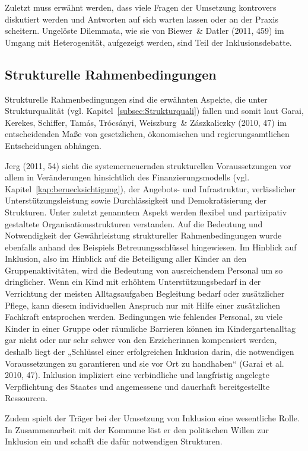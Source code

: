 Zuletzt muss erwähnt werden, dass viele Fragen der Umsetzung kontrovers diskutiert werden und Antworten auf sich warten lassen oder an der Praxis scheitern. Ungelöste Dilemmata, wie sie von Biewer~\& Datler (2011, 459) im Umgang mit Heterogenität, aufgezeigt werden, sind Teil der Inklusionsdebatte. 

\subsection{Strukturelle Rahmenbedingungen}\label{Strukturelle Rahmenbedingungen}
Strukturelle Rahmenbedingungen sind die erwähnten Aspekte, die unter Strukturqualität (vgl. Kapitel~\ref{subsec:Strukturquali}) fallen und somit laut Garai, Kerekes, Schiffer, Tamás, Trócsányi, Weiszburg~\& Zászkaliczky (2010, 47) im entscheidenden Maße von gesetzlichen, ökonomischen und regierungsamtlichen Entscheidungen abhängen.

Jerg (2011, 54) sieht die systemerneuernden strukturellen Voraussetzungen vor allem in Veränderungen hinsichtlich des Finanzierungsmodells (vgl. Kapitel~\ref{kap:beruecksichtigung}), der Angebots- und Infrastruktur, verlässlicher Unterstützungsleistung sowie Durchlässigkeit und Demokratisierung der Strukturen. Unter zuletzt genanntem Aspekt werden flexibel und partizipativ gestaltete Organisationsstrukturen verstanden. 
Auf die Bedeutung und Notwendigkeit der Gewährleistung struktureller Rahmenbedingungen wurde ebenfalls anhand des Beispiels Betreuungsschlüssel hingewiesen. Im Hinblick auf Inklusion, also im Hinblick auf die Beteiligung aller Kinder an den Gruppenaktivitäten, wird die Bedeutung von ausreichendem Personal um so dringlicher. Wenn ein Kind mit erhöhtem Unterstützungsbedarf in der Verrichtung der meisten Alltagsaufgaben Begleitung bedarf oder zusätzlicher Pflege, kann diesem individuellen Anspruch nur mit Hilfe einer zusätzlichen Fachkraft entsprochen werden. Bedingungen wie fehlendes Personal, zu viele Kinder in einer Gruppe oder räumliche Barrieren können im Kindergartenalltag gar nicht oder nur sehr schwer von den Erzieherinnen kompensiert werden, deshalb liegt der „Schlüssel einer erfolgreichen Inklusion darin, die notwendigen Voraussetzungen zu garantieren und sie vor Ort zu handhaben“ (Garai et al. 2010, 47). Inklusion impliziert eine verbindliche und langfristig angelegte Verpflichtung des Staates und angemessene und dauerhaft bereitgestellte Ressourcen.

Zudem spielt der Träger bei der Umsetzung von Inklusion eine wesentliche Rolle. In Zusammenarbeit mit der Kommune löst er den politischen Willen zur Inklusion ein und schafft die dafür notwendigen Strukturen. 

